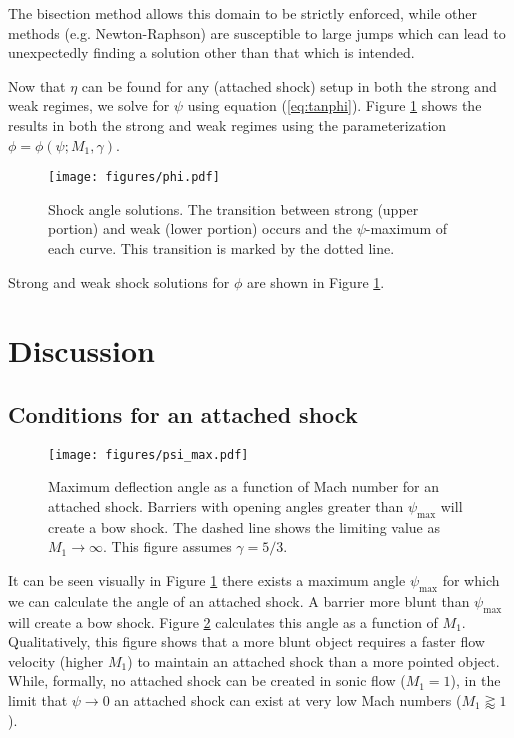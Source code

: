 \documentclass[twocolumn]{aastex631}
\begin{document}
The bisection method allows this domain to be strictly enforced, while other methods (e.g. Newton-Raphson) are susceptible to large jumps which can lead to unexpectedly finding a solution other than that which is intended.

Now that $\eta$ can be found for any (attached shock) setup in both the strong and weak regimes, we solve for $\psi$ using equation (\ref{eq:tanphi}). Figure \ref{fig:phi} shows the results in both the strong and weak regimes using the parameterization $\phi = \phi(\psi;M_1,\gamma)$.


\begin{figure}[t]
    \texttt{[image: figures/phi.pdf]}
    \caption{Shock angle solutions. The transition between strong (upper portion) and weak (lower portion) occurs and the $\psi$-maximum of each curve. This transition is marked by the dotted line.}
    \label{fig:phi}
\end{figure}

Strong and weak shock solutions for $\phi$ are shown in Figure \ref{fig:phi}.

\section{Discussion}
\subsection{Conditions for an attached shock}
\begin{figure}
    \texttt{[image: figures/psi\_max.pdf]}
    \caption{Maximum deflection angle as a function of Mach number for an attached shock. Barriers with opening angles greater than $\psi_\text{max}$ will create a bow shock. The dashed line shows the limiting value as $M_1 \rightarrow \infty$. This figure assumes $\gamma = 5/3$.}
    \label{fig:psi-max}
\end{figure}

It can be seen visually in Figure \ref{fig:phi} there exists a maximum angle $\psi_\text{max}$ for which we can calculate the angle of an attached shock. A barrier more blunt than $\psi_\text{max}$ will create a bow shock. Figure \ref{fig:psi-max} calculates this angle as a function of $M_1$. Qualitatively, this figure shows that a more blunt object requires a faster flow velocity (higher $M_1$) to maintain an attached shock than a more pointed object. While, formally, no attached shock can be created in sonic flow ($M_1=1$), in the limit that $\psi\rightarrow 0$ an attached shock can exist at very low Mach numbers ($M_1 \gtrapprox 1$).
\end{document}
